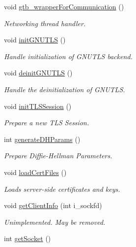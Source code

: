 \begin{DoxyCompactItemize}
void \hyperlink{classGTBCommunication_a7d93e8cd8f88f9dc86534d9ecab05f7c}{gtb\-\_\-wrapper\-For\-Communication} ()
\begin{DoxyCompactList}\small\item\em Networking thread handler. \end{DoxyCompactList}\item 
void \hyperlink{classGTBCommunication_ada748d331d99c87beff8f1052e728670}{init\-G\-N\-U\-T\-L\-S} ()
\begin{DoxyCompactList}\small\item\em Handle initialization of G\-N\-U\-T\-L\-S backend. \end{DoxyCompactList}\item 
void \hyperlink{classGTBCommunication_a298abd38038257bf206d22dab7f080f4}{deinit\-G\-N\-U\-T\-L\-S} ()
\begin{DoxyCompactList}\small\item\em Handle the deinitialization of G\-N\-U\-T\-L\-S. \end{DoxyCompactList}\item 
void \hyperlink{classGTBCommunication_a798bd82ec73644b1b7be23431c159993}{init\-T\-L\-S\-Session} ()
\begin{DoxyCompactList}\small\item\em Prepare a new T\-L\-S Session. \end{DoxyCompactList}\item 
int \hyperlink{classGTBCommunication_a22b23cdf3c160d540a1d5dddacf0efdf}{generate\-D\-H\-Params} ()
\begin{DoxyCompactList}\small\item\em Prepare Diffie-\/\-Hellman Parameters. \end{DoxyCompactList}\item 
void \hyperlink{classGTBCommunication_ae6c1cbc4736afe36731d442b72c181e4}{load\-Cert\-Files} ()
\begin{DoxyCompactList}\small\item\em Loads server-\/side certificates and keys. \end{DoxyCompactList}\item 
void \hyperlink{classGTBCommunication_a9603172b74add3207353ca4c49bb4290}{get\-Client\-Info} (int i\-\_\-sockfd)
\begin{DoxyCompactList}\small\item\em Unimplemented. May be removed. \end{DoxyCompactList}\item 
int \hyperlink{classGTBCommunication_a92ae038bbe4b05f7f17d9b9f59d6c158}{get\-Socket} ()

\end{DoxyCompactItemize}
